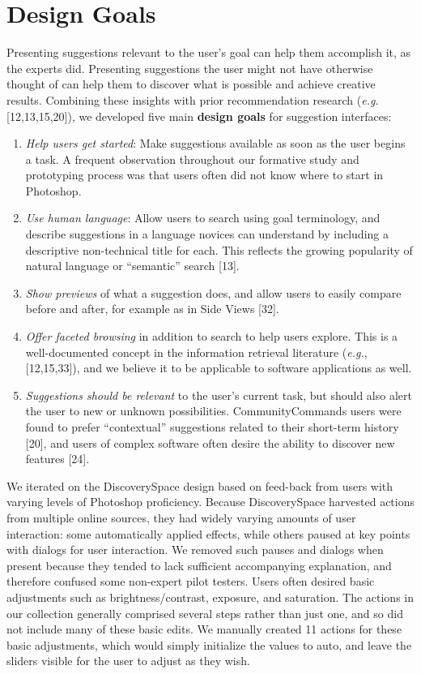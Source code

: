 \section{Design Goals}
Presenting suggestions relevant to the user's goal can help them accomplish it, as the experts did. Presenting suggestions the user might not have otherwise thought of can help them to discover what is possible and achieve creative results. Combining these insights with prior recommendation research (\textit{e.g.} [12,13,15,20]), we developed five main \textbf{design goals} for suggestion interfaces:
\begin{enumerate}
    \item \textit{Help users get started}: Make suggestions available as soon as the user begins a task. A frequent observation throughout our formative study and prototyping process was that users often did not know where to start in Photoshop.
    \item \textit{Use human language}: Allow users to search using goal terminology, and describe suggestions in a language novices can understand by including a descriptive non-technical title for each. This reflects the growing popularity of natural language or ``semantic'' search [13].
    \item \textit{Show previews} of what a suggestion does, and allow users to easily compare before and after, for example as in Side Views [32].
    \item \textit{Offer faceted browsing} in addition to search to help users explore. This is a well-documented concept in the information retrieval literature (\textit{e.g.}, [12,15,33]), and we believe it to be applicable to software applications as well.
    \item \textit{Suggestions should be relevant} to the user's current task, but should also alert the user to new or unknown possibilities. CommunityCommands users were found to prefer ``contextual'' suggestions related to their short-term history [20], and users of complex software often desire the ability to discover new features [24].
\end{enumerate}

We iterated on the Discovery\-Space design based on feed-back from users with varying levels of Photoshop proficiency. Because Discovery\-Space harvested actions from multiple online sources, they had widely varying amounts of user interaction: some automatically applied effects, while others paused at key points with dialogs for user interaction. We removed such pauses and dialogs when present because they tended to lack sufficient accompanying explanation, and therefore confused some non-expert pilot testers. Users often desired basic adjustments such as brightness/contrast, exposure, and saturation. The actions in our collection generally comprised several steps rather than just one, and so did not include many of these basic edits. We manually created 11 actions for these basic adjustments, which would simply initialize the values to auto, and leave the sliders visible for the user to adjust as they wish.